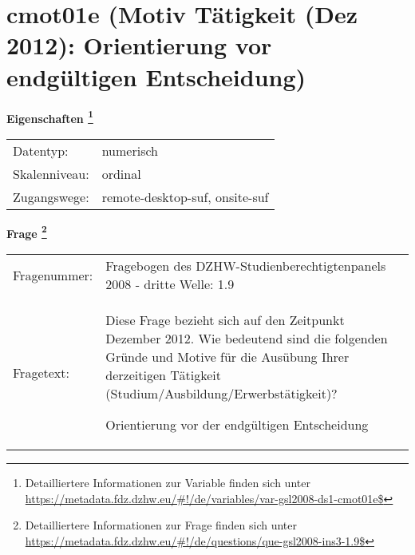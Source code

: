 
    \setcounter{footnote}{0}

    \vspace*{-1.8cm}
	\section{cmot01e (Motiv Tätigkeit (Dez 2012): Orientierung vor  endgültigen Entscheidung)}
	\label{section:cmot01e}



    \vspace*{0.5cm}
    \noindent\textbf{Eigenschaften
	\footnote{Detailliertere Informationen zur Variable finden sich unter
		\url{https://metadata.fdz.dzhw.eu/\#!/de/variables/var-gsl2008-ds1-cmot01e$}}}\\
	\begin{tabularx}{\hsize}{@{}lX}
	Datentyp: & numerisch \\
	Skalenniveau: & ordinal \\
	Zugangswege: &
	  remote-desktop-suf, 
	  onsite-suf
 \\
    \end{tabularx}



				\vspace*{0.5cm}
                \noindent\textbf{Frage
	                \footnote{Detailliertere Informationen zur Frage finden sich unter
		              \url{https://metadata.fdz.dzhw.eu/\#!/de/questions/que-gsl2008-ins3-1.9$}}}\\
				\begin{tabularx}{\hsize}{@{}lX}
					Fragenummer: &
					  Fragebogen des DZHW-Studienberechtigtenpanels 2008 - dritte Welle:
					  1.9
 \\
					Fragetext: & Diese Frage bezieht sich auf den Zeitpunkt Dezember 2012. Wie bedeutend sind die folgenden Gründe und Motive für die Ausübung Ihrer derzeitigen Tätigkeit (Studium/Ausbildung/Erwerbstätigkeit)?\par  Orientierung vor der endgültigen Entscheidung \\
				\end{tabularx}






